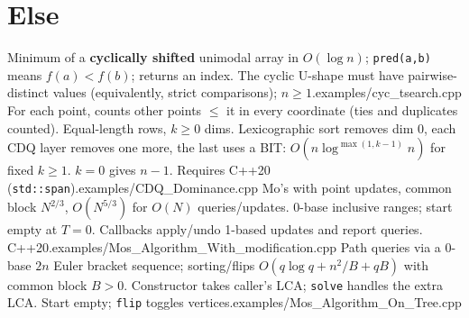 \section{Else}
%
{Minimum of a \textbf{cyclically shifted} unimodal array in $O(\log n)$; \texttt{pred(a,b)} means $f(a)<f(b)$; returns an index. The cyclic U-shape must have pairwise-distinct values (equivalently, strict comparisons); $n\ge1$.}{examples/cyc_tsearch.cpp}
%
{For each point, counts other points $\le$ it in every coordinate (ties and duplicates counted). Equal-length rows, $k\ge0$ dims. Lexicographic sort removes dim 0, each CDQ layer removes one more, the last uses a BIT: $O(n\log^{\max(1,k-1)}n)$ for fixed $k\ge1$. $k=0$ gives $n-1$. Requires C++20 (\texttt{std::span}).}{examples/CDQ_Dominance.cpp}
%
{Mo's with point updates, common block $N^{2/3}$, $O(N^{5/3})$ for $O(N)$ queries/updates. 0-base inclusive ranges; start empty at $T=0$. Callbacks apply/undo 1-based updates and report queries. C++20.}{examples/Mos_Algorithm_With_modification.cpp}
%
{Path queries via a 0-base $2n$ Euler bracket sequence; sorting/flips $O(q\log q+n^2/B+qB)$ with common block $B>0$. Constructor takes caller's LCA; \texttt{solve} handles the extra LCA. Start empty; \texttt{flip} toggles vertices.}{examples/Mos_Algorithm_On_Tree.cpp}
